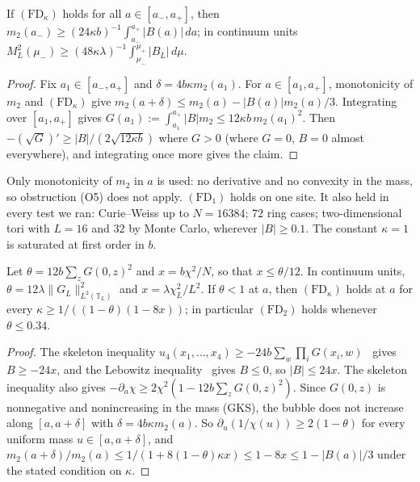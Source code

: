 \begin{proposition}\label{prop:FD}
If $(\mathrm{FD}_\kappa)$ holds for all $a\in[a_-,a_+]$, then $m_2(a_-)\ge(24\kappa b)^{-1}\int_{a_-}^{a_+}|B(a)|\,da$; in continuum units $M_L^2(\mu_-)\ge(48\kappa\lambda)^{-1}\int_{\mu_-}^{\mu_+}|B_L|\,d\mu$.
\end{proposition}

\begin{proof}
Fix $a_1\in[a_-,a_+]$ and $\delta=4b\kappa m_2(a_1)$. For $a\in[a_1,a_+]$, monotonicity of $m_2$ and $(\mathrm{FD}_\kappa)$ give $m_2(a+\delta)\le m_2(a)-|B(a)|m_2(a)/3$. Integrating over $[a_1,a_+]$ gives $G(a_1):=\int_{a_1}^{a_+}|B|m_2\le12\kappa b\,m_2(a_1)^2$. Then $-(\sqrt G)'\ge|B|/(2\sqrt{12\kappa b})$ where $G>0$ (where $G=0$, $B=0$ almost everywhere), and integrating once more gives the claim.
\end{proof}

Only monotonicity of $m_2$ in $a$ is used: no derivative and no convexity in the mass, so obstruction (O5) does not apply. $(\mathrm{FD}_1)$ holds on one site. It also held in every test we ran: Curie--Weiss up to $N=16384$; $72$ ring cases; two-dimensional tori with $L=16$ and $32$ by Monte Carlo, wherever $|B|\ge0.1$. The constant $\kappa=1$ is saturated at first order in $b$.

\begin{theorem}\label{thm:FDbubble}
Let $\theta=12b\sum_zG(0,z)^2$ and $x=b\chi^2/N$, so that $x\le\theta/12$. In continuum units, $\theta=12\lambda\|G_L\|_{L^2(\mathbb T_L)}^2$ and $x=\lambda\chi_L^2/L^2$. If $\theta<1$ at $a$, then $(\mathrm{FD}_\kappa)$ holds at $a$ for every $\kappa\ge1/((1-\theta)(1-8x))$; in particular $(\mathrm{FD}_2)$ holds whenever $\theta\le0.34$.
\end{theorem}

\begin{proof}
The skeleton inequality $u_4(x_1,\dots,x_4)\ge-24b\sum_w\prod_iG(x_i,w)$~\cite{BFS82,FFS92} gives $B\ge-24x$, and the Lebowitz inequality~\cite{Leb74,SG73} gives $B\le0$, so $|B|\le24x$. The skeleton inequality also gives $-\partial_a\chi\ge2\chi^2(1-12b\sum_zG(0,z)^2)$. Since $G(0,z)$ is nonnegative and nonincreasing in the mass (GKS), the bubble does not increase along $[a,a+\delta]$ with $\delta=4b\kappa m_2(a)$. So $\partial_u(1/\chi(u))\ge2(1-\theta)$ for every uniform mass $u\in[a,a+\delta]$, and $m_2(a+\delta)/m_2(a)\le1/(1+8(1-\theta)\kappa x)\le1-8x\le1-|B(a)|/3$ under the stated condition on $\kappa$.
\end{proof}

